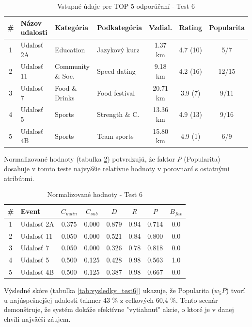 \begin{table}[H]
\centering
\small
\begin{tabular}{|c|l|l|l|c|c|c|}
\hline
\textbf{\#} & \textbf{Názov udalosti} & \textbf{Kategória} & \textbf{Podkategória} & \textbf{Vzdial.} & \textbf{Rating} & \textbf{Popularita} \\
\hline
1 & Udalosť 2A & Education          & Jazykový kurz  & 1.37 km  & 4.7 (10) & 5/7 \\
2 & Udalosť 11 & Community \& Soc.  & Speed dating   & 9.18 km  & 4.2 (16) & 12/15 \\
3 & Udalosť 7  & Food \& Drinks     & Food festival  & 20.71 km & 3.9 (7)  & 9/11 \\
4 & Udalosť 5  & Sports             & Strength \& C. & 13.36 km & 4.9 (13) & 9/16 \\
5 & Udalosť 4B & Sports             & Team sports    & 15.80 km & 4.9 (1)  & 6/9 \\
\hline
\end{tabular}
\caption{Vstupné údaje pre TOP 5 odporúčaní - Test 6}
\label{tab:data_test6}
\end{table}

Normalizované hodnoty (tabuľka \ref{tab:norm_test6}) potvrdzujú, že faktor $P$ (Popularita) dosahuje v tomto teste najvyššie relatívne hodnoty v porovnaní s ostatnými atribútmi.

\begin{table}[H]
\centering
\small
\begin{tabular}{|c|l|c|c|c|c|c|c|}
\hline
\textbf{\#} & \textbf{Event} & $C_{main}$ & $C_{sub}$ & $D$ & $R$ & $P$ & $B_{fav}$ \\
\hline
1 & Udalosť 2A & 0.375 & 0.000 & 0.879 & 0.94 & 0.714 & 0.0 \\
2 & Udalosť 11 & 0.050 & 0.000 & 0.521 & 0.84 & 0.800 & 0.0 \\
3 & Udalosť 7  & 0.050 & 0.000 & 0.326 & 0.78 & 0.818 & 0.0 \\
4 & Udalosť 5  & 0.500 & 0.125 & 0.428 & 0.98 & 0.563 & 1.0 \\
5 & Udalosť 4B & 0.500 & 0.125 & 0.387 & 0.98 & 0.667 & 0.0 \\
\hline
\end{tabular}
\caption{Normalizované hodnoty - Test 6}
\label{tab:norm_test6}
\end{table}



Výsledné skóre (tabuľka \ref{tab:vysledky_test6}) ukazuje, že Popularita ($w_5 P$) tvorí u najúspešnejšej udalosti takmer 43 \% z celkových 60,4 \%. Tento scenár demonštruje, že systém dokáže efektívne "vytiahnuť" akcie, o ktoré je v danej chvíli najväčší záujem.

